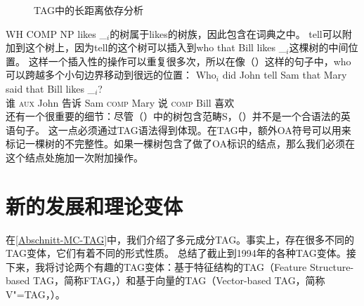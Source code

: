 \begin{figure}
\caption{\label{abb-nld-TAG}TAG中的长距离依存分析}
\end{figure}%
WH COMP NP likes \_$_i$的树属于likes的树族，因此包含在词典之中。
tell可以附加到这个树上，因为tell的这个树可以插入到who that Bill likes \_$_i$这棵树的中间位置。
这样一个插入性的操作可以重复很多次，所以在像（）这样的句子中，who可以跨越多个小句边界移动到很远的位置：
\ea 
\gll Who$_i$ did John tell Sam that Mary said that Bill likes \_$_i$?\\
     谁      \textsc{aux} John 告诉 Sam \textsc{comp} Mary 说 \textsc{comp} Bill 喜欢\\
\z
%
还有一个很重要的细节：尽管（）中的树包含范畴S，（）并不是一个合语法的英语句子。
\z
这一点必须通过TAG语法得到体现。在TAG中，额外OA符号可以用来标记一棵树的不完整性。如果一棵树包含了做了OA标识的结点，那么我们必须在这个结点处施加一次附加操作。

\section{新的发展和理论变体}

在\ref{Abschnitt-MC-TAG}中，我们介绍了多元成分TAG。事实上，存在很多不同的TAG变体，它们有着不同的形式性质。
 \citet[\page]{Rambow94a}总结了截止到1994年的各种TAG变体。接下来，我将讨论两个有趣的TAG变体：基于特征结构的TAG（Feature Structure-based TAG，简称FTAG\indexftagc，\citealp{VSJ88a}）和基于向量的TAG（Vector-based TAG，简称V"=TAG，\citealp{Rambow94a}）。

